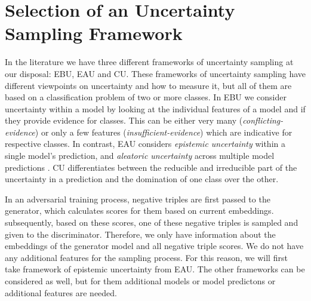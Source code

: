 \section{Selection of an Uncertainty Sampling Framework} 
\label{sec:selection_of_an_uncertainty_sampling_type}

In the literature we have three different frameworks of uncertainty sampling at our disposal:
\ac{EBU}, \ac{EAU} and \ac{CU}.
These frameworks of uncertainty sampling have different viewpoints on uncertainty and how to measure it, but all of them are based on a classification problem of two or more classes.
In \ac{EBU} we consider uncertainty within a model by looking at the individual features of a model and if they provide evidence for classes.
This can be either very many (\textit{conflicting-evidence}) or only a few features (\textit{insufficient-evidence}) which are indicative for respective classes.
In contrast, \ac{EAU} considers \textit{epistemic uncertainty} within a single model’s prediction, and \textit{aleatoric uncertainty} across multiple model predictions \cite{human-in-the-loop}.
\Ac{CU} differentiates between the reducible and irreducible part of the uncertainty in a prediction and the domination of one class over the other.

In an adversarial training process, negative triples are first passed to the generator, which calculates scores for them based on current embeddings.
subsequently, based on these scores, one of these negative triples is sampled and given to the discriminator.
Therefore, we only have information about the embeddings of the generator model and all negative triple scores.
We do not have any additional features for the sampling process.
For this reason, we will first take framework of epistemic uncertainty from \ac{EAU}.
The other frameworks can be considered as well, but for them additional models or model predictons or additional features are needed.




